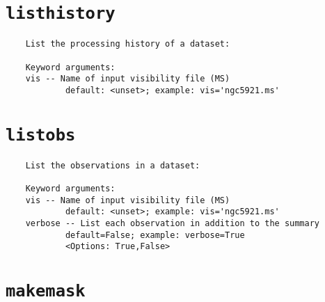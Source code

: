\section{{\tt listhistory}}
\label{section:tasks.listhistory}

\small
\begin{verbatim}
    List the processing history of a dataset:
    
    Keyword arguments:
    vis -- Name of input visibility file (MS)
            default: <unset>; example: vis='ngc5921.ms'
\end{verbatim}
\normalsize


\section{{\tt listobs}}
\label{section:tasks.listobs}

\small
\begin{verbatim}
    List the observations in a dataset:
    
    Keyword arguments:
    vis -- Name of input visibility file (MS)
            default: <unset>; example: vis='ngc5921.ms'
    verbose -- List each observation in addition to the summary
            default=False; example: verbose=True
            <Options: True,False>
\end{verbatim}
\normalsize


\section{{\tt makemask}}
\label{section:tasks.makemask}

